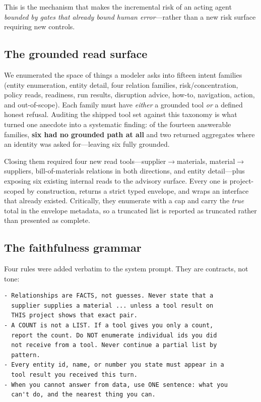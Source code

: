 \documentclass[conference]{IEEEtran}
\begin{document}
This is the mechanism that makes the incremental risk of an acting agent
\emph{bounded by gates that already bound human error}---rather than a new risk
surface requiring new controls.

\subsection{The grounded read surface}
\label{sec:reads}

We enumerated the space of things a modeler asks into fifteen intent families
(entity enumeration, entity detail, four relation families, risk/concentration,
policy reads, readiness, run results, disruption advice, how-to, navigation,
action, and out-of-scope). Each family must have \emph{either} a grounded tool
\emph{or} a defined honest refusal. Auditing the shipped tool set against this
taxonomy is what turned one anecdote into a systematic finding: of the fourteen
answerable families, \textbf{six had no grounded path at all} and two returned
aggregates where an identity was asked for---leaving six fully grounded.

Closing them required four new read tools---supplier$\rightarrow$materials,
material$\rightarrow$suppliers, bill-of-materials relations in both directions,
and entity detail---plus exposing six existing internal reads to the advisory
surface. Every one is project-scoped by construction, returns a strict typed
envelope, and wraps an interface that already existed. Critically, they enumerate
with a cap and carry the \emph{true} total in the envelope metadata, so a
truncated list is reported as truncated rather than presented as complete.

\subsection{The faithfulness grammar}

Four rules were added verbatim to the system prompt. They are contracts, not
tone:

\begin{lstlisting}[caption={The faithfulness rules (abridged).}]
- Relationships are FACTS, not guesses. Never state that a
  supplier supplies a material ... unless a tool result on
  THIS project shows that exact pair.
- A COUNT is not a LIST. If a tool gives you only a count,
  report the count. Do NOT enumerate individual ids you did
  not receive from a tool. Never continue a partial list by
  pattern.
- Every entity id, name, or number you state must appear in a
  tool result you received this turn.
- When you cannot answer from data, use ONE sentence: what you
  can't do, and the nearest thing you can.
\end{lstlisting}
\end{document}
